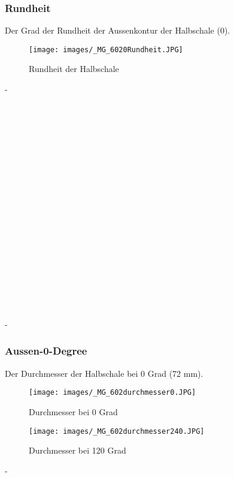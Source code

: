 \subsubsection*{Rundheit}
Der Grad der Rundheit der Aussenkontur der Halbschale (0).

\begin{wrapfigure}{r}{0.3\textwidth}
\centering
\texttt{[image: images/\_MG\_6020Rundheit.JPG]}
\caption{Rundheit der Halbschale}
\label{fig:DefR}
\end{wrapfigure}

-\\
\\
\\
\\
\\
\\
\\
\\
\\
\\
\\
\\
\\
\\
\\
\\
\\
\\
\\
\\
-\\

\subsubsection*{Aussen-0-Degree}

Der Durchmesser der Halbschale bei 0 Grad (72 mm).

\begin{wrapfigure}{r}{0.3\textwidth}
\centering
\texttt{[image: images/\_MG\_602durchmesser0.JPG]}
\caption{Durchmesser bei 0 Grad}
\label{fig:Def0}
\end{wrapfigure}

\begin{wrapfigure}{r}{0.3\textwidth}
\centering
\texttt{[image: images/\_MG\_602durchmesser240.JPG]}
\caption{Durchmesser bei 120 Grad}
\label{fig:Def120}
\end{wrapfigure}
-\\
\\
\\
\\
\\
\\

